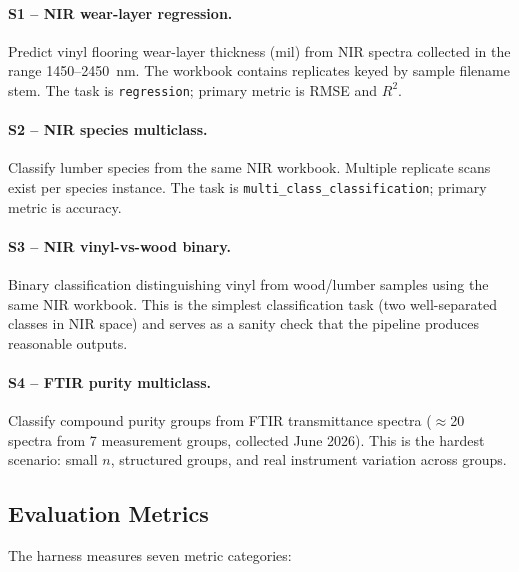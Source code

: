 \paragraph{S1 -- NIR wear-layer regression.}
Predict vinyl flooring wear-layer thickness (mil) from NIR spectra
collected in the range 1450--2450~nm.
The workbook contains replicates keyed by sample filename stem.
The task is \texttt{regression}; primary metric is RMSE and $R^2$.

\paragraph{S2 -- NIR species multiclass.}
Classify lumber species from the same NIR workbook.
Multiple replicate scans exist per species instance.
The task is \texttt{multi\_class\_classification}; primary metric is accuracy.

\paragraph{S3 -- NIR vinyl-vs-wood binary.}
Binary classification distinguishing vinyl from wood/lumber samples using
the same NIR workbook.
This is the simplest classification task (two well-separated classes
in NIR space) and serves as a sanity check that the pipeline produces
reasonable outputs.

\paragraph{S4 -- FTIR purity multiclass.}
Classify compound purity groups from FTIR transmittance spectra
($\approx$20 spectra from 7 measurement groups, collected June 2026).
This is the hardest scenario: small $n$, structured groups, and real
instrument variation across groups.

\subsection{Evaluation Metrics}

The harness measures seven metric categories:


